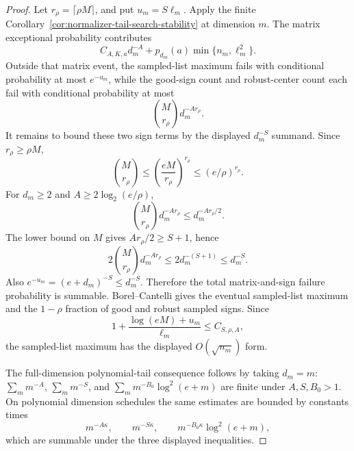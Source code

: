 \documentclass[11pt]{amsart}
\numberwithin{equation}{section}
\theoremstyle{definition}
\theoremstyle{remark}
\begin{document}
\begin{proof}
Let \(r_\rho=\lceil\rho M\rceil\), and put \(u_m=S\ell_m\).  Apply the finite
Corollary~\ref{cor:normalizer-tail-search-stability} at dimension \(m\).  The
matrix exceptional probability contributes
\[
  C_{A,K,a}d_m^{-A}+p_{d_m}(a)\min\{n_m,\ell_m^2\}.
\]
Outside that matrix event, the sampled-list maximum fails with conditional
probability at most \(e^{-u_m}\), while the good-sign count and robust-center
count each fail with conditional probability at most
\[
  \binom{M}{r_\rho}d_m^{-A r_\rho}.
\]
It remains to bound these two sign terms by the displayed \(d_m^{-S}\) summand.
Since \(r_\rho\ge\rho M\),
\[
  \binom{M}{r_\rho}\le \left(\frac{eM}{r_\rho}\right)^{r_\rho}
  \le (e/\rho)^{r_\rho}.
\]
For \(d_m\ge2\) and \(A\ge2\log_2(e/\rho)\),
\[
  \binom{M}{r_\rho}d_m^{-A r_\rho}
  \le d_m^{-A r_\rho/2}.
\]
The lower bound on \(M\) gives \(A r_\rho/2\ge S+1\), hence
\[
  2\binom{M}{r_\rho}d_m^{-A r_\rho}\le 2d_m^{-(S+1)}\le d_m^{-S}.
\]
Also \(e^{-u_m}=(e+d_m)^{-S}\le d_m^{-S}\).  Therefore the total
matrix-and-sign failure probability is summable.  Borel--Cantelli gives the
eventual sampled-list maximum and the \(1-\rho\) fraction of good and robust
sampled signs.  Since
\[
  1+\frac{\log(eM)+u_m}{\ell_m}
  \le C_{S,\rho,A},
\]
the sampled-list maximum has the displayed \(O(\sqrt{n_m})\) form.

The full-dimension polynomial-tail consequence follows by taking \(d_m=m\):
\(\sum_m m^{-A}\), \(\sum_m m^{-S}\), and
\(\sum_m m^{-B_0}\log^2(e+m)\) are finite under \(A,S,B_0>1\).  On polynomial
dimension schedules the same estimates are bounded by constants times
\[
  m^{-A\kappa},\qquad
  m^{-S\kappa},\qquad
  m^{-B_0\kappa}\log^2(e+m),
\]
which are summable under the three displayed inequalities.
\end{proof}
\end{document}
